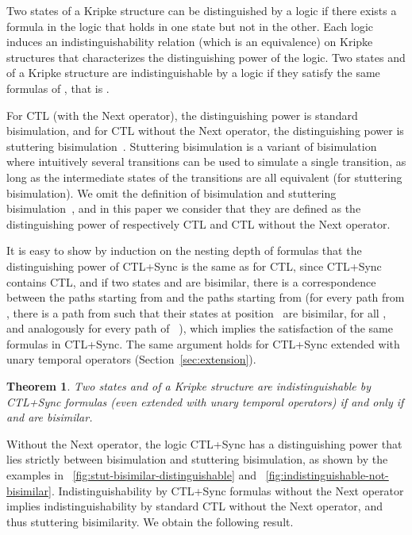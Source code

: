 \documentclass{article}
\newtheorem{theorem}{Theorem}
\begin{document}
Two states of a Kripke structure can be distinguished by a logic if there 
exists a formula in the logic that holds in one state but not in the other.
Each logic induces an indistinguishability relation (which is an equivalence)
on Kripke structures that characterizes the distinguishing power of the logic.
Two states  and  of a Kripke structure  are indistinguishable by 
a logic  if they satisfy the same formulas of , that is
.

For CTL (with the Next operator), the distinguishing power is standard bisimulation,
and for CTL without the Next operator, the distinguishing power is stuttering
bisimulation~\cite{BCG88}. Stuttering bisimulation is a variant of bisimulation
where intuitively several transitions can be used to simulate a single transition,
as long as the intermediate states of the transitions are all equivalent (for 
stuttering bisimulation). We omit the definition of bisimulation and
stuttering bisimulation~\cite{BCG88}, and in this paper we consider that they 
are defined as the distinguishing power of respectively CTL and CTL without 
the Next operator.

It is easy to show by induction on the nesting depth of formulas that the distinguishing 
power of CTL+Sync is the same as for CTL, since  CTL+Sync contains CTL, and 
 if two states  and 
are bisimilar, there is a correspondence between the paths starting
from  and the paths starting from  (for every path from , there is a
path from  such that their states at position~ are bisimilar, for all , and analogously for every path
of ~\cite[Lemma 3.1]{BCG88}), which implies the satisfaction of the same formulas in CTL+Sync.
The same argument holds for CTL+Sync extended with unary temporal operators (Section~\ref{sec:extension}).




\begin{theorem}\label{theo:CTL+Sync-bisimulation}
Two states  and  of a Kripke structure  
are indistinguishable by CTL+Sync formulas (even extended with unary temporal operators)
if and only if  and  are bisimilar. 
\end{theorem}

Without the Next operator, the logic CTL+Sync has a distinguishing power that
lies strictly between bisimulation and stuttering bisimulation, as shown
by the examples in \figurename~\ref{fig:stut-bisimilar-distinguishable} 
and \figurename~\ref{fig:indistinguishable-not-bisimilar}.
Indistinguishability by CTL+Sync formulas without the Next operator implies
indistinguishability by standard CTL without the Next operator, and thus
stuttering bisimilarity. We obtain the following result.
\end{document}
